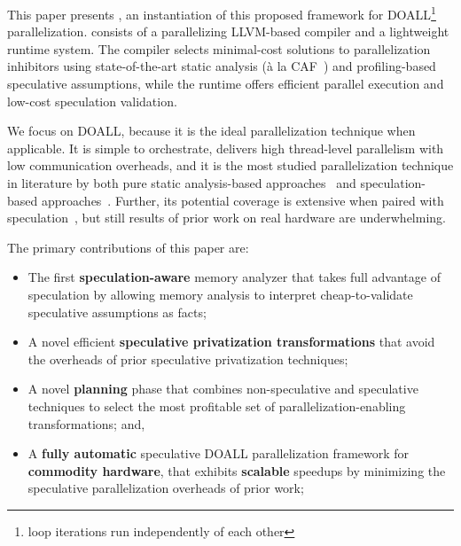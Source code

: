 This paper presents \name, an instantiation of this proposed framework
for DOALL\footnote{loop iterations run independently of each other}
parallelization. \name consists of a parallelizing LLVM-based compiler
and a lightweight
runtime system. The compiler selects minimal-cost solutions to
parallelization inhibitors using state-of-the-art static analysis
(\`{a} la CAF~\cite{johnson:cgo:17}) and profiling-based speculative
assumptions, while the runtime offers efficient parallel execution and
low-cost speculation validation.

We focus on DOALL, because it is the ideal parallelization technique
when applicable. It is simple to orchestrate, delivers high
thread-level parallelism with low communication overheads, and it is
the most studied parallelization technique in literature by both pure
static analysis-based approaches~\cite{..,.,..} and speculation-based
approaches~\cite{..,..,..,..}.  Further, its potential coverage is
extensive when paired with speculation~\cite{zhong:08:hpca}, but still
results of prior work on real hardware are underwhelming.

The primary contributions of this paper are:
\begin{itemize}

\item The first \textbf{speculation-aware} memory analyzer that takes
full advantage of speculation by allowing memory analysis to interpret
cheap-to-validate speculative assumptions as facts;

\item A novel efficient \textbf{speculative privatization transformations}
that avoid the overheads of prior speculative privatization
techniques;

\item A novel \textbf{planning} phase that combines non-speculative
and speculative techniques to select the most profitable set of
parallelization-enabling transformations; and,

\item A \textbf{fully automatic} speculative DOALL parallelization
framework for \textbf{commodity hardware}, that exhibits
\textbf{scalable} speedups by minimizing the speculative
parallelization overheads of prior work;

\end{itemize}


